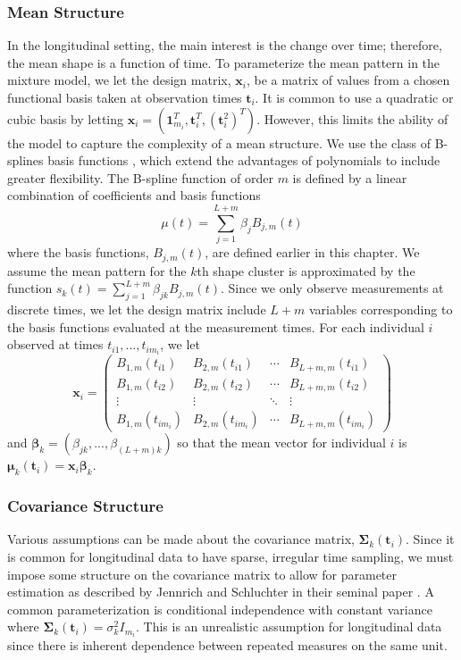 \documentclass[12pt]{article}
\newcommand{\B}[0]{\mathbf}
\newcommand{\bs}[0]{\boldsymbol}
\begin{document}
\subsubsection{Mean Structure}
In the longitudinal setting, the main interest is the change over time; therefore, the mean shape is a function of time. To parameterize the mean pattern in the mixture model, we let the design matrix, $\B x_{i}$, be a matrix of values from a chosen functional basis taken at observation times $\B t_{i}$. It is common to use a quadratic or cubic basis by letting $\B x_{i} = (\B 1_{m_{i}}^{T},\B t_{i}^{T}, (\B t^{2}_{i})^{T})$. However, this limits the ability of the model to capture the complexity of a mean structure. We use the class of B-splines basis functions \cite{deboor1978, schumaker1981,curry1966, de1976}, which extend the advantages of polynomials to include greater flexibility. The B-spline function of order $m$ is defined by a linear combination of coefficients and basis functions
$$\mu(t) = \sum^{L+m}_{j=1} \beta_j B_{j,m}(t)$$
where the basis functions, $B_{j,m}(t)$, are defined earlier in this chapter. We assume the mean pattern for the $k$th shape cluster is approximated by the function $s_{k}(t)=\sum^{L+m}_{j=1} \beta_{jk} B_{j,m}(t)$.  Since we only observe measurements at discrete times, we let the design matrix include $L+m$ variables corresponding to the basis functions evaluated at the measurement times.  For each individual $i$ observed at times $t_{i1},...,t_{im_{i}}$, we let $$\B x_{i} = \left(\begin{array}{cccc} 
B_{1,m}(t_{i1})&B_{2,m}(t_{i1})&\cdots&B_{L+m,m}(t_{i1})\\
B_{1,m}(t_{i2})&B_{2,m}(t_{i2})&\cdots&B_{L+m,m}(t_{i2})\\
\vdots&\vdots&\ddots&\vdots\\
B_{1,m}(t_{im_{i}})&B_{2,m}(t_{im_{i}})&\cdots&B_{L+m,m}(t_{im_{i}})\end{array}\right)$$
and $\bs\beta_{k} = (\beta_{jk},...,\beta_{(L+m) k})$ so that the mean vector for individual $i$ is $\bs\mu_{k}(\B t_{i}) = \B x_{i}\bs\beta_{k}$.

\subsubsection{Covariance Structure}
Various assumptions can be made about the covariance matrix, $\B \Sigma_{k}(\B t_{i})$. Since it is common for longitudinal data to have sparse, irregular time sampling, we must impose some structure on the covariance matrix to allow for parameter estimation as described by Jennrich and Schluchter in their seminal paper \cite{jennrich1986}. A common parameterization is conditional independence with constant variance where $\B \Sigma_{k}(\B t_{i}) = \sigma_{k}^{2}I_{m_{i}}$. This is an unrealistic assumption for longitudinal data since there is inherent dependence between repeated measures on the same unit. \\
\end{document}
